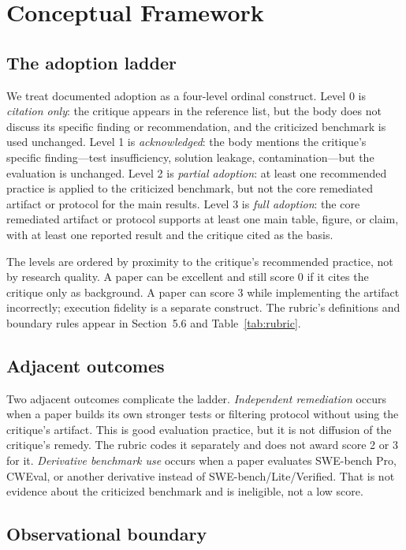\documentclass[11pt,a4paper]{article}
\begin{document}
\section{Conceptual Framework}

\subsection{The adoption ladder}

We treat documented adoption as a four-level ordinal construct. Level 0 is \emph{citation only}: the critique appears in the reference list, but the body does not discuss its specific finding or recommendation, and the criticized benchmark is used unchanged. Level 1 is \emph{acknowledged}: the body mentions the critique's specific finding---test insufficiency, solution leakage, contamination---but the evaluation is unchanged. Level 2 is \emph{partial adoption}: at least one recommended practice is applied to the criticized benchmark, but not the core remediated artifact or protocol for the main results. Level 3 is \emph{full adoption}: the core remediated artifact or protocol supports at least one main table, figure, or claim, with at least one reported result and the critique cited as the basis.

The levels are ordered by proximity to the critique's recommended practice, not by research quality. A paper can be excellent and still score 0 if it cites the critique only as background. A paper can score 3 while implementing the artifact incorrectly; execution fidelity is a separate construct. The rubric's definitions and boundary rules appear in Section~5.6 and Table~\ref{tab:rubric}.

\subsection{Adjacent outcomes}

Two adjacent outcomes complicate the ladder. \emph{Independent remediation} occurs when a paper builds its own stronger tests or filtering protocol without using the critique's artifact. This is good evaluation practice, but it is not diffusion of the critique's remedy. The rubric codes it separately and does not award score 2 or 3 for it. \emph{Derivative benchmark use} occurs when a paper evaluates SWE-bench Pro, CWEval, or another derivative instead of SWE-bench/Lite/Verified. That is not evidence about the criticized benchmark and is ineligible, not a low score.

\subsection{Observational boundary}
\end{document}
